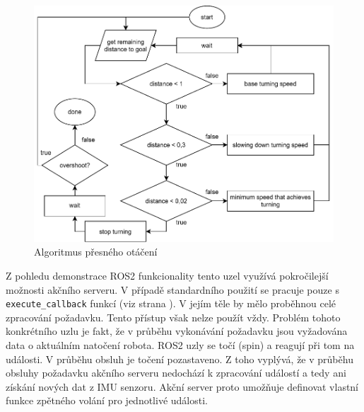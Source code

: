 \begin{figure}[h!]
	\centering
	\includegraphics[scale=0.75]{obrazky-figures/precise_turning.pdf}
	\caption{Algoritmus přesného otáčení}
	\label{fig:alg_motor_controller}
\end{figure}

Z pohledu demonstrace ROS2 funkcionality tento uzel využívá pokročilejší možnosti akčního serveru. V případě standardního použití se pracuje pouze s \verb|execute_callback| funkcí (viz strana \pageref{theory:action}). V jejím těle by mělo proběhnou celé zpracování požadavku. Tento přístup však nelze použít vždy. Problém tohoto konkrétního uzlu je fakt, že v průběhu vykonávání požadavku jsou vyžadována data o aktuálním natočení robota. ROS2 uzly se točí (spin) a reagují při tom na události. V průběhu obsluh je točení pozastaveno. Z toho vyplývá, že v průběhu obsluhy požadavku akčního serveru nedochází k zpracování událostí a tedy ani získání nových dat z IMU senzoru. Akční server proto umožňuje definovat vlastní funkce zpětného volání pro jednotlivé události.

